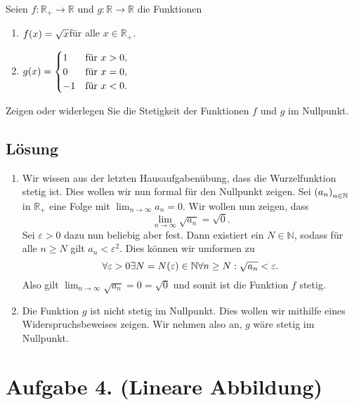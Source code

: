 \documentclass[german,12pt]{homework}
\newcommand{\NN}{\mathbb{N}}
\newcommand{\RR}{\mathbb{R}}
\DeclarePairedDelimiter{\enbrace}{(}{)}
\begin{document}
    \begin{problem}
        Seien \(f: \RR_+ \to \RR\) und \(g: \RR \to \RR\) die Funktionen
        \begin{enumerate}
            \item \(f\enbrace*{x} = \sqrt{x}\){\quad}für alle \(x \in \RR_+\).
            \item \(g\enbrace*{x} = \begin{cases}
                1 & \text{für }x > 0,\\
                0 & \text{für }x = 0,\\
                -1 & \text{für }x < 0.
            \end{cases}\)
        \end{enumerate}
        Zeigen oder widerlegen Sie die Stetigkeit der Funktionen \(f\) und \(g\)
        im Nullpunkt.
    \end{problem}

    \subsection*{Lösung}
    \begin{enumerate}
        \item Wir wissen aus der letzten Hausaufgabenübung, dass die
        Wurzelfunktion stetig ist. Dies wollen wir nun formal für den Nullpunkt
        zeigen. Sei \(\enbrace*{a_n}_{n \in \NN}\) in \(\RR_+\) eine Folge mit
        \(\lim_{n \to \infty}a_n = 0\). Wir wollen nun zeigen, dass
        \[\lim_{n \to \infty}\sqrt{a_n} = \sqrt{0}.\]
        Sei \(\varepsilon > 0\) dazu nun beliebig aber fest. Dann existiert ein
        \(N \in \NN\), sodass für alle \(n \ge N\) gilt \(a_n < \varepsilon^2\).
        Dies können wir umformen zu
        \[{\forall}\varepsilon > 0{\exists}N = N\enbrace*{\varepsilon} \in \NN
        {\forall}n \ge N: \sqrt{a_n} < \varepsilon.\]
        Also gilt \(\lim_{n \to \infty}\sqrt{a_n} = 0 = \sqrt{0}\) und somit ist
        die Funktion \(f\) stetig.
        \item Die Funktion \(g\) ist nicht stetig im Nullpunkt. Dies wollen wir
        mithilfe eines Widerspruchsbeweises zeigen. Wir nehmen also an, \(g\)
        wäre stetig im Nullpunkt.
    \end{enumerate}

    \section*{Aufgabe 4. (Lineare Abbildung)}
\end{document}

